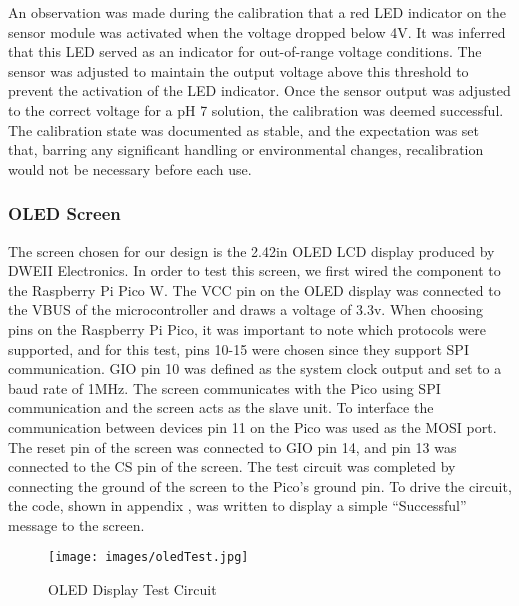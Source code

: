 \documentclass[12pt]{article} %
\begin{document}
\pagebreak
\noindent An observation was made during the calibration that a red LED indicator on the sensor module was activated when the voltage dropped below 4V. It was inferred that this LED served as an indicator for out-of-range voltage conditions. The sensor was adjusted to maintain the output voltage above this threshold to prevent the activation of the LED indicator.
Once the sensor output was adjusted to the correct voltage for a pH 7 solution, the calibration was deemed successful. The calibration state was documented as stable, and the expectation was set that, barring any significant handling or environmental changes, recalibration would not be necessary before each use. 

\subsubsection{OLED Screen}

\noindent The screen chosen for our design is the 2.42in OLED LCD display produced by DWEII Electronics. In order to test this screen, we first wired the component to the Raspberry Pi Pico W. The VCC pin on the OLED display was connected to the VBUS of the microcontroller and draws a voltage of 3.3v. When choosing pins on the Raspberry Pi Pico, it was important to note which protocols were supported, and for this test, pins 10-15 were chosen since they support SPI communication. GIO pin 10 was defined as the system clock output and set to a baud rate of 1MHz. The screen communicates with the Pico using SPI communication and the screen acts as the slave unit. To interface the communication between devices pin 11 on the Pico was used as the MOSI port. The reset pin of the screen was connected to GIO pin 14, and pin 13 was connected to the CS pin of the screen. The test circuit was completed by connecting the ground of the screen to the Pico’s ground pin. To drive the circuit, the code, shown in appendix , was written to display a simple “Successful” message to the screen.

\begin{figure}[H]
  \centering
  \texttt{[image: images/oledTest.jpg]}
  \caption{OLED Display Test Circuit}
  \label{fig:OLED Test}
\end{figure}
\end{document}
